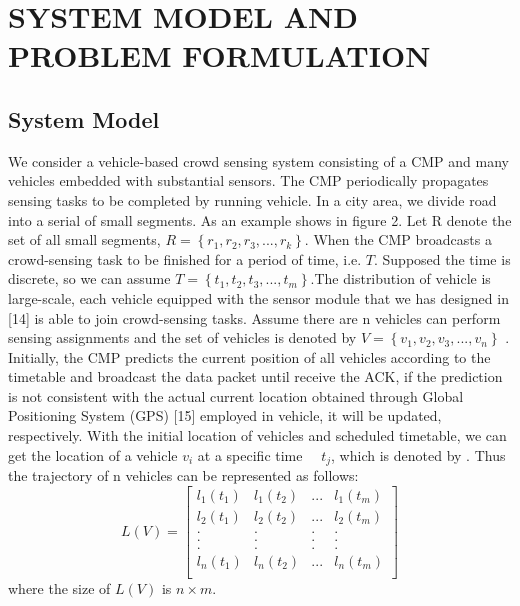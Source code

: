 \documentclass[journal]{IEEEtran}
\begin{document}

\section{SYSTEM MODEL AND PROBLEM FORMULATION}
 \subsection{System Model }
  We consider a vehicle-based crowd sensing system consisting of a CMP and many vehicles embedded with substantial sensors. The CMP periodically propagates sensing tasks to be completed by running vehicle. 
  In a city area, we divide road into a serial of small segments. As an example shows in figure 2. Let R denote the set of all small segments, $R=\left \{ r_{1},r_{2},r_{3},...,r_{k} \right \}$. When the CMP broadcasts a crowd-sensing task to be finished for a period of time, i.e. $T$. Supposed the time is discrete, so we can assume $T=\left \{ t_{1},t_{2},t_{3},...,t_{m} \right \}$.The distribution of vehicle is large-scale, each vehicle equipped with the sensor module that we has designed in [14] is able to join crowd-sensing tasks. Assume there are n vehicles can perform sensing assignments and the set of vehicles is denoted by $V=\left \{ v_{1},v_{2},v_{3},...,v_{n}\right \}$ . Initially, the CMP predicts the current position of all vehicles according to the timetable and broadcast the data packet until receive the ACK, if the prediction is not consistent with the actual current location obtained through Global Positioning System (GPS) [15] employed in vehicle, it will be updated, respectively.  With the initial location of vehicles and scheduled timetable, we can get the location of a vehicle $v_{i}$ at a specific time　 $t_{j}$, which is denoted by  . Thus the trajectory of n vehicles can be represented as follows:
  \setcounter{equation}{0}
  \begin{equation}
  L(V)=\begin{bmatrix}
  l_{1}(t_{1})&l_{1}(t_{2})&... & l_{1}(t_{m})\\ 
  l_{2}(t_{1})&l_{2}(t_{2})&... & l_{2}(t_{m})\\
  .&. &.&.\\ 
  .&. &.&.\\
  .&. &.&.\\
  l_{n}(t_{1})&l_{n}(t_{2})&... & l_{n}(t_{m})\\
  \end{bmatrix}
  \end{equation}
  where the size of $L(V)$ is $n\times m$.
  
\end{document}
